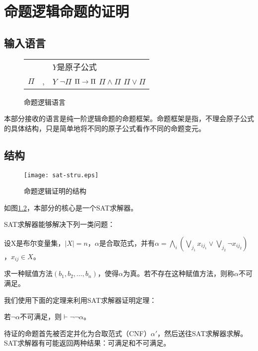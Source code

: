 \chapter{命题逻辑命题的证明}
\label{chap:sat}

\section{输入语言}
\begin{figure}[!htbp]
  \centering
  \begin{tabular}[rcl]{rcl}
    & & $Y$是原子公式 \\
    $\Pi$ & \sep{} & $Y$ \deli{} $\lnot \Pi$ \deli{} $\Pi \rightarrow \Pi$ \deli{} $\Pi \land \Pi$ \deli{} $\Pi \lor \Pi$ \\
  \end{tabular}
  \caption{命题逻辑语言}
  \label{sat:syntax}
\end{figure}
本部分接收的语言是纯一阶逻辑命题的命题框架。命题框架是指，不理会原子公式的具体结构，只是简单地将不同的原子公式看作不同的命题变元。

\section{结构}
\begin{figure}[!htbp]
  \centering
  \texttt{[image: sat-stru.eps]}
  \caption{命题逻辑证明的结构}
  \label{sat:stru}
\end{figure}
如图\ref{sat:stru}，本部分的核心是一个SAT求解器。

SAT求解器能够解决下列一类问题：

\begin{definition}[SAT问题]
设X是布尔变量集，$|X|=n$，$\alpha$是合取范式，并有$\alpha = \bigwedge_i (\bigvee_{j_1} x_{ij_1} \lor \bigvee_{j_2} \lnot x_{ij_2})$，$x_{ij} \in X$。

求一种赋值方法$(b_1, b_2, \dots, b_n)$，使得$\alpha$为真。若不存在这种赋值方法，则称$\alpha$不可满足。
\end{definition}

我们使用下面的定理来利用SAT求解器证明定理：

\begin{theorem}
  若$\lnot \alpha$不可满足，则$\vdash \lnot \lnot \alpha$。
\end{theorem}

待证的命题首先被否定并化为合取范式（CNF）$\alpha'$，然后送往SAT求解器求解。SAT求解器有可能返回两种结果：可满足和不可满足。

